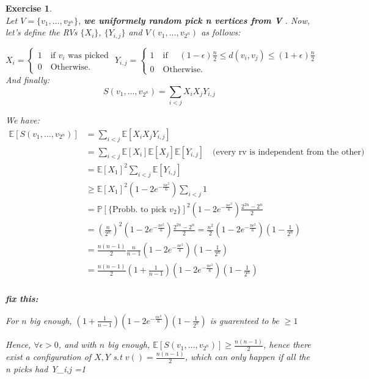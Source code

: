 \documentclass{article}
\newtheorem{exo}{Exercise}
\def\P{\mathbb{P}}
\def\E{\mathbb{E}}
\begin{document}
\begin{exo}{\ \\}
Let $V = \{v_1, \dots, v_{2^n}\}$, \textbf{we uniformely random pick n vertices from V }.  Now, let's define the RVs $\{X_i\}$, $\{Y_{i,j}\}$ and $V(v_1, \dots, v_{2^n})$ as follows:

\[
X_i = 
\begin{cases}
    1 \quad \text{if $v_i$ was picked } \\
    0 \quad \text{Otherwise.}
\end{cases}
Y_{i,j} = 
\begin{cases}
    1 \quad \text{if } \quad
    (1-\epsilon)\frac{n}{2} \leq d(v_i, v_j) \leq (1+\epsilon)\frac{n}{2} \\
    0 \quad \text{Otherwise.}
\end{cases}
\]
And finally:
\[
S(v_1, \dots, v_{2^n}) = \sum_{i < j} X_i X_j Y_{i,j}
\]

We have:
\begin{align*}
    \E[S(v_1, \dots, v_{2^n})] 
    &= \sum_{i < j} \E[X_i X_j Y_{i,j}] \\
    &= \sum_{i < j} \E[X_i] \E[X_j] \E[Y_{i,j}] 
    \quad \text{(every rv is independent from the other)}\\
    &= \E[X_1]^2 \sum_{i < j} \E[Y_{i,j}] \\
    &\geq \E[X_1]^2 (1 - 2 e^{-\frac{n \epsilon^2 }{6}})  \sum_{i < j} 1 \\ 
    &= \P[\{\text{Probb. to pick $v_2$}\}]^2 (1 - 2 e^{-\frac{n \epsilon^2 }{6}})  
    \frac{2^{2n} - 2^n}{2} \\ 
    &= \left(\frac{n}{2^n}\right)^2 (1 - 2 e^{-\frac{n \epsilon^2 }{6}})  
    \frac{2^{2n} - 2^n}{2}
    = \frac{n^2}{2}  (1 - 2 e^{-\frac{n \epsilon^2 }{6}})(1 - \frac{1}{2^n} ) \\ 
    &= \frac{n(n-1)}{2} \frac{n}{n-1}  (1 - 2 e^{-\frac{n \epsilon^2 }{6}})(1 - \frac{1}{2^n} ) \\ 
    &= \frac{n(n-1)}{2} 
    (1 + \frac{1}{n-1})(1 - 2 e^{-\frac{n \epsilon^2 }{6}})(1 - \frac{1}{2^n} ) \\ 
\end{align*}

\textbf{fix this:} 

For $n$ big enough, 
$(1 + \frac{1}{n-1})(1 - 2 e^{-\frac{n \epsilon^2 }{6}})(1 - \frac{1}{2^n} )$ is guarenteed to be $\geq 1$

Hence, $\forall \epsilon > 0$, and  with $n$ big enough, $\E[S(v_1, \dots, v_{2^n})] \geq \frac{n(n-1)}{2}  $, hence there exist a configuration of $X, Y$ s.t $v() = \frac{n(n-1)}{2} $, which can only happen if all the n picks had Y_{i,j} =1


\end{exo}
\end{document}
